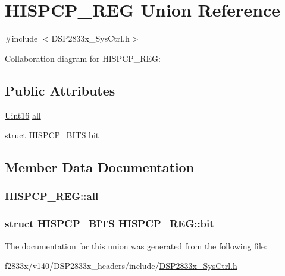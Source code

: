\hypertarget{union_h_i_s_p_c_p___r_e_g}{}\section{H\+I\+S\+P\+C\+P\+\_\+\+R\+E\+G Union Reference}
\label{union_h_i_s_p_c_p___r_e_g}


{\ttfamily \#include $<$D\+S\+P2833x\+\_\+\+Sys\+Ctrl.\+h$>$}



Collaboration diagram for H\+I\+S\+P\+C\+P\+\_\+\+R\+E\+G\+:
\subsection*{Public Attributes}
\begin{DoxyCompactItemize}
\item 
\hyperlink{_d_s_p2833x___device_8h_a59a9f6be4562c327cbfb4f7e8e18f08b}{Uint16} \hyperlink{union_h_i_s_p_c_p___r_e_g_a16a5b18d968ca31275c1c7bebe60e917}{all}
\item 
struct \hyperlink{struct_h_i_s_p_c_p___b_i_t_s}{H\+I\+S\+P\+C\+P\+\_\+\+B\+I\+T\+S} \hyperlink{union_h_i_s_p_c_p___r_e_g_a33200d722535e490b03d011ae815c6e1}{bit}
\end{DoxyCompactItemize}


\subsection{Member Data Documentation}
\hypertarget{union_h_i_s_p_c_p___r_e_g_a16a5b18d968ca31275c1c7bebe60e917}{}
\subsubsection[{all}]{ H\+I\+S\+P\+C\+P\+\_\+\+R\+E\+G\+::all}\label{union_h_i_s_p_c_p___r_e_g_a16a5b18d968ca31275c1c7bebe60e917}
\hypertarget{union_h_i_s_p_c_p___r_e_g_a33200d722535e490b03d011ae815c6e1}{}
\subsubsection[{bit}]{\setlength{\rightskip}{0pt plus 5cm}struct {\bf H\+I\+S\+P\+C\+P\+\_\+\+B\+I\+T\+S} H\+I\+S\+P\+C\+P\+\_\+\+R\+E\+G\+::bit}\label{union_h_i_s_p_c_p___r_e_g_a33200d722535e490b03d011ae815c6e1}


The documentation for this union was generated from the following file\+:\begin{DoxyCompactItemize}
\item 
f2833x/v140/\+D\+S\+P2833x\+\_\+headers/include/\hyperlink{_d_s_p2833x___sys_ctrl_8h}{D\+S\+P2833x\+\_\+\+Sys\+Ctrl.\+h}\end{DoxyCompactItemize}
